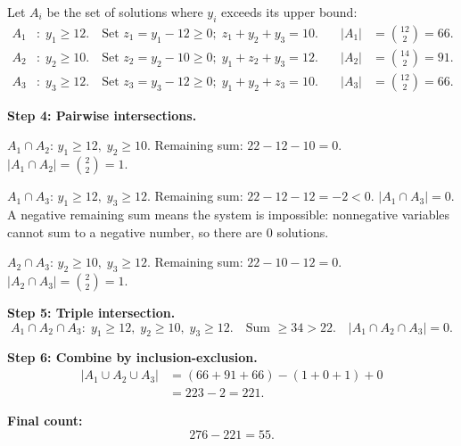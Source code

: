 \documentclass[12pt, a4paper]{article}
\begin{document}
Let $A_i$ be the set of solutions where $y_i$ exceeds its upper bound:
\begin{align*}
  A_1 &:\; y_1 \ge 12. \quad
        \text{Set } z_1 = y_1 - 12 \ge 0;\;
        z_1 + y_2 + y_3 = 10.
  &\quad |A_1| &= \binom{12}{2} = 66. \\
  A_2 &:\; y_2 \ge 10. \quad
        \text{Set } z_2 = y_2 - 10 \ge 0;\;
        y_1 + z_2 + y_3 = 12.
  &\quad |A_2| &= \binom{14}{2} = 91. \\
  A_3 &:\; y_3 \ge 12. \quad
        \text{Set } z_3 = y_3 - 12 \ge 0;\;
        y_1 + y_2 + z_3 = 10.
  &\quad |A_3| &= \binom{12}{2} = 66.
\end{align*}

\textbf{Step 4: Pairwise intersections.}

$A_1 \cap A_2$: $y_1 \ge 12,\; y_2 \ge 10$.
Remaining sum: $22 - 12 - 10 = 0$.
\quad $|A_1 \cap A_2| = \binom{2}{2} = 1$.

$A_1 \cap A_3$: $y_1 \ge 12,\; y_3 \ge 12$.
Remaining sum: $22 - 12 - 12 = -2 < 0$.
\quad $|A_1 \cap A_3| = 0$.
A negative remaining sum means the system is impossible: nonnegative variables cannot sum to a negative number, so there are $0$ solutions.

$A_2 \cap A_3$: $y_2 \ge 10,\; y_3 \ge 12$.
Remaining sum: $22 - 10 - 12 = 0$.
\quad $|A_2 \cap A_3| = \binom{2}{2} = 1$.

\textbf{Step 5: Triple intersection.}
\[
  A_1 \cap A_2 \cap A_3:\; y_1 \ge 12,\; y_2 \ge 10,\; y_3 \ge 12.
  \quad \text{Sum } \ge 34 > 22. \quad |A_1 \cap A_2 \cap A_3| = 0.
\]

\textbf{Step 6: Combine by inclusion-exclusion.}
\begin{align*}
  |A_1 \cup A_2 \cup A_3|
  &= (66 + 91 + 66) - (1 + 0 + 1) + 0 \\
  &= 223 - 2 = 221.
\end{align*}

\textbf{Final count:}
\[
  276 - 221 = 55.
\]
\end{document}
